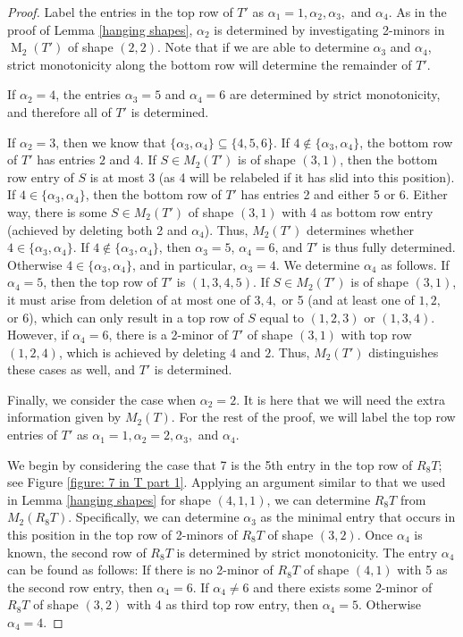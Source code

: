 \documentclass[12pt]{amsart}
\theoremstyle{definition}
\theoremstyle{remark}
\numberwithin{equation}{section}
\numberwithin{figure}{section}
\newcommand{\M}{\operatorname{M}}
\begin{document}
\begin{proof}
	Label the entries in the top row of $T'$ as $\alpha_1=1,\alpha_2,\alpha_3,$ and $\alpha_4$. As in the proof of Lemma \ref{hanging shapes}, $\alpha_2$ is determined by investigating 2-minors in $\M_2(T')$ of shape $(2,2)$. Note that if we are able to determine $\alpha_3$ and $\alpha_4$, strict monotonicity along the bottom row will determine the remainder of $T'$.
	
	If $\alpha_2=4$, the entries $\alpha_3=5$ and $\alpha_4=6$ are determined by strict monotonicity, and therefore all of $T'$ is determined.
	
	If $\alpha_2=3$, then we know that $\{\alpha_3,\alpha_4\}\subseteq\{4,5,6\}$. If $4\notin\{\alpha_3,\alpha_4\}$, the bottom row of $T'$ has entries $2$ and $4$. If $S\in M_2(T')$ is of shape $(3,1)$, then the bottom row entry of $S$ is at most 3 (as 4 will be relabeled if it has slid into this position). If $4\in\{\alpha_3,\alpha_4\}$, then the bottom row of $T'$ has entries 2 and either 5 or 6. Either way, there is some $S\in M_2(T')$ of shape $(3,1)$ with 4 as bottom row entry (achieved by deleting both 2 and $\alpha_4$). Thus, $M_2(T')$ determines whether $4\in \{\alpha_3,\alpha_4\}$. If $4\notin\{\alpha_3,\alpha_4\}$, then $\alpha_3=5$, $\alpha_4=6$, and $T'$ is thus fully determined. Otherwise $4\in\{\alpha_3,\alpha_4\}$, and in particular, $\alpha_3=4$. We determine $\alpha_4$ as follows. If $\alpha_4=5$, then the top row of $T'$ is $(1,3,4,5)$. If $S\in M_2(T')$ is of shape $(3,1)$, it must arise from deletion of at most one of $3,4,$ or 5 (and at least one of $1,2,$ or 6), which can only result in a top row of $S$ equal to $(1,2,3)$ or $(1,3,4)$. However, if $\alpha_4=6$, there is a 2-minor of $T'$ of shape $(3,1)$ with top row $(1,2,4)$, which is achieved by deleting $4$ and $2$. Thus, $M_2(T')$ distinguishes these cases as well, and $T'$ is determined.
	
	Finally, we consider the case when $\alpha_2=2$. It is here that we will need the extra information given by $M_2(T)$. For the rest of the proof, we will label the top row entries of $T'$ as $\alpha_1 =1, \alpha_2 =2, \alpha_3,$ and $\alpha_4$.
	
	We begin by considering the case that 7 is the 5th entry in the top row of $R_8T$; see Figure \ref{figure: 7 in T part 1}. Applying an argument similar to that we used in Lemma \ref{hanging shapes} for shape $(4,1,1)$, we can determine $R_8T$ from $M_2(R_8T)$. Specifically, we can determine $\alpha_3$ as the minimal entry that occurs in this position in the top row of 2-minors of $R_8T$ of shape $(3,2)$. Once $\alpha_4$ is known, the second row of $R_8T$ is determined by strict monotonicity. The entry $\alpha_4$ can be found as follows: If there is no 2-minor of $R_8T$ of shape $(4,1)$ with
    5 as the second row entry, then $\alpha_4 =6$. If $\alpha_4 \ne 6$ and there exists some 2-minor of $R_8T$ of shape $(3,2)$ with 4 as third top row entry, then $\alpha_4 =5$. Otherwise $\alpha_4 =4$.


\end{proof}
\end{document}
